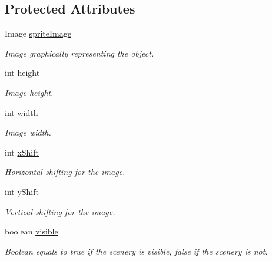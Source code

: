 \subsection*{Protected Attributes}
\begin{DoxyCompactItemize}
\item 
Image \hyperlink{a00024_a512d9c0a154e6843389e343d80843326}{sprite\-Image}
\begin{DoxyCompactList}\small\item\em Image graphically representing the object. \end{DoxyCompactList}\item 
int \hyperlink{a00024_a54b4edfa060087e78a829105bf62a900}{height}
\begin{DoxyCompactList}\small\item\em Image height. \end{DoxyCompactList}\item 
int \hyperlink{a00024_ad10b27080954e2fc06aa1718f47c4ce1}{width}
\begin{DoxyCompactList}\small\item\em Image width. \end{DoxyCompactList}\item 
int \hyperlink{a00024_a0999f105f7630fd67fd9d440da6983aa}{x\-Shift}
\begin{DoxyCompactList}\small\item\em Horizontal shifting for the image. \end{DoxyCompactList}\item 
int \hyperlink{a00024_ac9ca2c17cf6920deffe490c013b0e638}{y\-Shift}
\begin{DoxyCompactList}\small\item\em Vertical shifting for the image. \end{DoxyCompactList}\item 
boolean \hyperlink{a00024_a7b22a78d3126c947b7010fdbbea02218}{visible}
\begin{DoxyCompactList}\small\item\em Boolean equals to true if the scenery is visible, false if the scenery is not. \end{DoxyCompactList}\end{DoxyCompactItemize}
